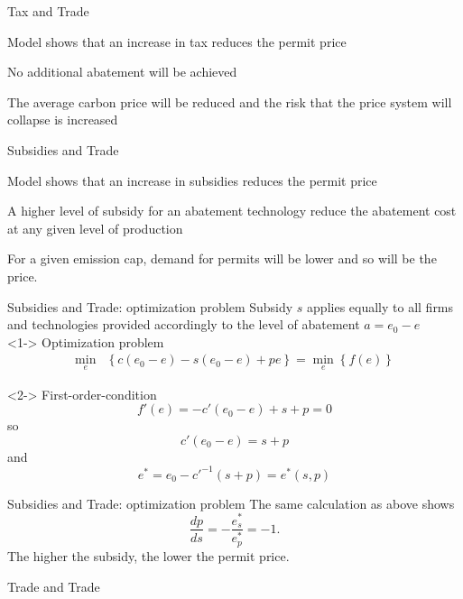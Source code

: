 


{Tax and Trade}






	Model shows that an increase in tax reduces the permit price


	No additional abatement will be achieved


	The average carbon price will be reduced and the risk that the price system will collapse is increased





{Subsidies and Trade}






	Model shows that an increase in subsidies reduces the permit price


	A higher level of subsidy for an abatement technology reduce the abatement cost at any given level of production


	For a given emission cap, demand for permits will be lower and so will be the price.


{Subsidies and Trade: optimization problem}
Subsidy $s$ applies equally to all firms and technologies provided accordingly to the level of abatement $a = e_0 - e$ \\






	<1-> Optimization problem
\begin{align}
\min_{e} & \left\{c(e_0-e)-s(e_0-e)+pe\right\} = \min_{e}\left\{f(e)\right\}
\end{align}


	<2-> First-order-condition
\[
f'(e)=-c'(e_0-e)+ s+p = 0
\]
so
\[
c'(e_0-e)=s+p
\]
and
\[
e^*=e_0-c'^{-1}(s+p)=e^*(s,p)
\]






{Subsidies and Trade: optimization problem}
The same calculation as above shows
\[
\frac{dp}{ds} = -\frac{e^*_s}{e^*_p}=-1.
\]
The higher the subsidy, the lower the permit price.

{Trade and Trade}






